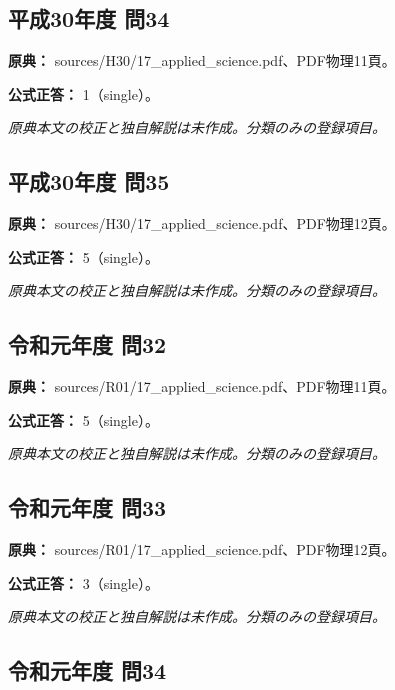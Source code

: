 \subsection{平成30年度 問34}
\label{q:h30-reg-applied-34}

\noindent\textbf{原典：} sources/H30/17\_applied\_science.pdf、PDF物理11頁。

\textbf{公式正答：} 1（single）。

\par\textit{原典本文の校正と独自解説は未作成。分類のみの登録項目。}

\subsection{平成30年度 問35}
\label{q:h30-reg-applied-35}

\noindent\textbf{原典：} sources/H30/17\_applied\_science.pdf、PDF物理12頁。

\textbf{公式正答：} 5（single）。

\par\textit{原典本文の校正と独自解説は未作成。分類のみの登録項目。}

\subsection{令和元年度 問32}
\label{q:r01-reg-applied-32}

\noindent\textbf{原典：} sources/R01/17\_applied\_science.pdf、PDF物理11頁。

\textbf{公式正答：} 5（single）。

\par\textit{原典本文の校正と独自解説は未作成。分類のみの登録項目。}

\subsection{令和元年度 問33}
\label{q:r01-reg-applied-33}

\noindent\textbf{原典：} sources/R01/17\_applied\_science.pdf、PDF物理12頁。

\textbf{公式正答：} 3（single）。

\par\textit{原典本文の校正と独自解説は未作成。分類のみの登録項目。}

\subsection{令和元年度 問34}
\label{q:r01-reg-applied-34}

